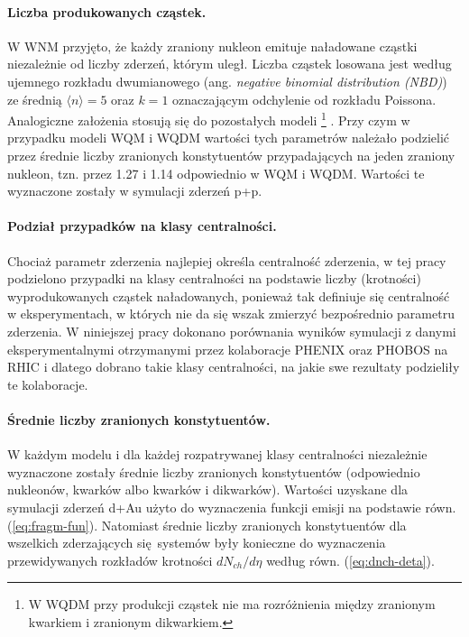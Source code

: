 \documentclass[a4paper,12pt]{article}
\begin{document}
\paragraph{Liczba produkowanych cząstek.}
W WNM przyjęto, że każdy zraniony nukleon emituje naładowane cząstki niezależnie od liczby zderzeń, którym uległ. Liczba cząstek losowana jest według ujemnego rozkładu dwumianowego (ang. \textit{negative binomial distribution (NBD)}) ze średnią $\langle n \rangle = 5$ oraz $k = 1$ oznaczającym odchylenie od rozkładu Poissona. Analogiczne założenia stosują się do pozostałych modeli \footnote{W WQDM przy produkcji cząstek nie ma rozróżnienia między zranionym kwarkiem i zranionym dikwarkiem.} . Przy czym w przypadku modeli WQM i WQDM wartości tych parametrów należało podzielić przez średnie liczby zranionych konstytuentów przypadających na jeden zraniony nukleon, tzn. przez 1.27 i 1.14 odpowiednio w WQM i WQDM. Wartości te wyznaczone zostały w symulacji zderzeń p+p.

\paragraph{Podział przypadków na klasy centralności.}
Chociaż parametr zderzenia najlepiej określa centralność zderzenia, w tej pracy podzielono przypadki na klasy centralności na podstawie liczby (krotności) wyprodukowanych cząstek naładowanych, ponieważ tak definiuje się centralność w eksperymentach, w których nie da się wszak zmierzyć bezpośrednio parametru zderzenia. W niniejszej pracy dokonano porównania wyników symulacji z danymi eksperymentalnymi otrzymanymi przez kolaboracje PHENIX oraz PHOBOS na RHIC i dlatego dobrano takie klasy centralności, na jakie swe rezultaty podzieliły te kolaboracje.

\paragraph{Średnie liczby zranionych konstytuentów.}
W każdym modelu i dla każdej rozpatrywanej klasy centralności niezależnie wyznaczone zostały średnie liczby zranionych konstytuentów (odpowiednio nukleonów, kwarków albo kwarków i dikwarków). Wartości uzyskane dla symulacji zderzeń d+Au użyto do wyznaczenia funkcji emisji na podstawie równ. (\ref{eq:fragm-fun}). Natomiast średnie liczby zranionych konstytuentów dla wszelkich zderzających się systemów były konieczne do wyznaczenia przewidywanych rozkładów krotności $dN_{ch}/d\eta$ według równ. (\ref{eq:dnch-deta}).
\end{document}

